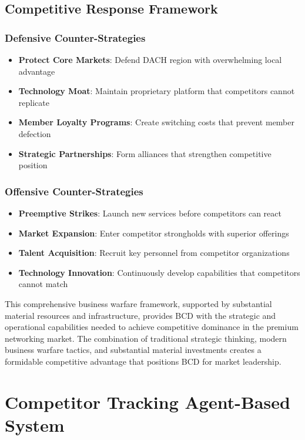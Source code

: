 \subsection{Competitive Response Framework}

\subsubsection{Defensive Counter-Strategies}
\begin{itemize}
    \item \textbf{Protect Core Markets}: Defend DACH region with overwhelming local advantage
    \item \textbf{Technology Moat}: Maintain proprietary platform that competitors cannot replicate
    \item \textbf{Member Loyalty Programs}: Create switching costs that prevent member defection
    \item \textbf{Strategic Partnerships}: Form alliances that strengthen competitive position
\end{itemize}

\subsubsection{Offensive Counter-Strategies}
\begin{itemize}
    \item \textbf{Preemptive Strikes}: Launch new services before competitors can react
    \item \textbf{Market Expansion}: Enter competitor strongholds with superior offerings
    \item \textbf{Talent Acquisition}: Recruit key personnel from competitor organizations
    \item \textbf{Technology Innovation}: Continuously develop capabilities that competitors cannot match
\end{itemize}

This comprehensive business warfare framework, supported by substantial material resources and infrastructure, provides BCD with the strategic and operational capabilities needed to achieve competitive dominance in the premium networking market. The combination of traditional strategic thinking, modern business warfare tactics, and substantial material investments creates a formidable competitive advantage that positions BCD for market leadership.

\section{Competitor Tracking Agent-Based System}

